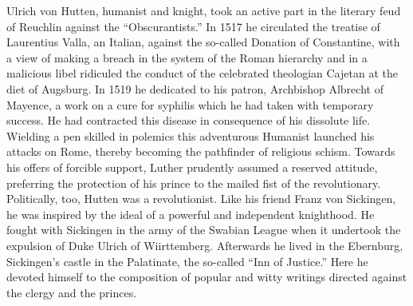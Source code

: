 Ulrich von Hutten, humanist and knight, took an active part in
the literary feud of Reuchlin against the “Obscurantists.” In 1517
he circulated the treatise of Laurentius Valla, an Italian, against
the so-called Donation of Constantine, with a view of making a
breach in the system of the Roman hierarchy and in a malicious
libel ridiculed the conduct of the celebrated theologian Cajetan at
the diet of Augsburg. In 1519 he dedicated to his patron, Archbishop Albrecht
of Mayence, a work on a cure for syphilis which he
had taken with temporary success. He had contracted this disease in
consequence of his dissolute life. Wielding a pen skilled in polemics
this adventurous Humanist launched his attacks on Rome, thereby
becoming the pathfinder of religious schism. Towards his offers of
forcible support, Luther prudently assumed a reserved attitude, preferring
the protection of his prince to the mailed fist of the revolutionary.
Politically, too, Hutten was a revolutionist. Like his
friend Franz von Sickingen, he was inspired by the ideal of a powerful
and independent knighthood. He fought with Sickingen in
the army of the Swabian League when it undertook the expulsion
of Duke Ulrich of Wiirttemberg. Afterwards he lived in the Ebernburg,
Sickingen’s castle in the Palatinate, the so-called “Inn of Justice.”
Here he devoted himself to the composition of popular
and witty writings directed against the clergy and the princes.

